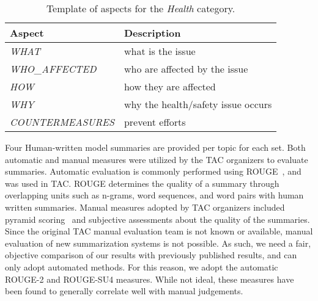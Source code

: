 
\begin{table}[h]
\centering
\begin{tabular}{l||l}
Aspect & Description  \\ \hline
\textit{WHAT} & what is the issue\\
\textit{WHO\_AFFECTED} & who are affected by the issue\\
\textit{HOW} & how they are affected\\
\textit{WHY} & why the health/safety issue occurs\\
\textit{COUNTERMEASURES} & prevent efforts
\end{tabular}
\caption{Template of aspects for the \emph{Health} category.}
\label{table:health-aspects}
\end{table}

Four Human-written model summaries are provided per topic for each set.
Both automatic and manual measures were utilized by the TAC organizers to evaluate summaries. Automatic evaluation is commonly performed using ROUGE~\cite{rouge}, and was used in TAC. ROUGE determines the quality of a summary through overlapping units such as n-grams, word sequences, and word pairs with human written summaries. Manual measures adopted by TAC organizers included pyramid scoring~\cite{eval:pyramids} and subjective assessments about the quality of the summaries.  Since the original TAC manual evaluation team is not known or available, manual evaluation of new summarization systems is not possible.  As such, we need a fair, objective comparison of our results with previously published results, and can only adopt automated methods.  For this reason, we adopt the automatic ROUGE-2 and ROUGE-SU4 measures.
 While not ideal, these measures have been found to generally correlate well with manual judgements.
